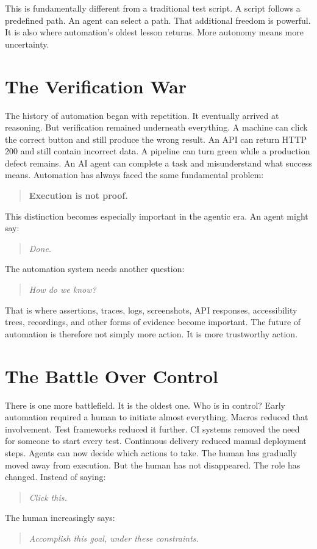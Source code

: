 \documentclass[11pt,twoside]{book}
\begin{document}
This is fundamentally different from a traditional test script.
A script follows a predefined path.
An agent can select a path.
That additional freedom is powerful.
It is also where automation's oldest lesson returns.
More autonomy means more uncertainty.

\section*{The Verification War}

The history of automation began with repetition.
It eventually arrived at reasoning.
But verification remained underneath everything.
A machine can click the correct button and still produce the wrong result.
An API can return HTTP 200 and still contain incorrect data.
A pipeline can turn green while a production defect remains.
An AI agent can complete a task and misunderstand what success means.
Automation has always faced the same fundamental problem:
\begin{quote}
\textbf{Execution is not proof.}
\end{quote}
This distinction becomes especially important in the agentic era.
An agent might say:
\begin{quote}
\emph{Done.}
\end{quote}
The automation system needs another question:
\begin{quote}
\emph{How do we know?}
\end{quote}
That is where assertions, traces, logs, screenshots, API responses, accessibility trees, recordings, and other forms of evidence become important.
The future of automation is therefore not simply more action.
It is more trustworthy action.

\section*{The Battle Over Control}

There is one more battlefield.
It is the oldest one.
Who is in control?
Early automation required a human to initiate almost everything.
Macros reduced that involvement.
Test frameworks reduced it further.
CI systems removed the need for someone to start every test.
Continuous delivery reduced manual deployment steps.
Agents can now decide which actions to take.
The human has gradually moved away from execution.
But the human has not disappeared.
The role has changed.
Instead of saying:
\begin{quote}
\emph{Click this.}
\end{quote}
The human increasingly says:
\begin{quote}
\emph{Accomplish this goal, under these constraints.}
\end{quote}
\end{document}
